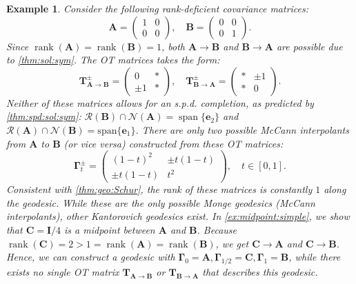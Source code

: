 \documentclass[noinfoline]{imsart}\setcounter{tocdepth}{2}
\newcommand{\m}[1]{\mathbf{#1}} %
\renewcommand{\c}[1]{\mathcal{#1}} %
\DeclareMathOperator*{\spann}{span}
\DeclareMathOperator*{\rk}{rank}
\theoremstyle{plain}
\newtheorem{example}{Example}[section]
\begin{document}
\begin{example}\label{ex:rk:goes:up}
Consider the following rank-deficient covariance matrices:
\begin{equation*}
    \m{A} = \begin{pmatrix}
    1 & 0 \\
    0 & 0
    \end{pmatrix}, \quad \m{B} = \begin{pmatrix}
    0 & 0 \\
    0 & 1
    \end{pmatrix}.
\end{equation*}
Since $\rk (\m{A}) = \rk (\m{B}) = 1$, both $\m{A} \to \m{B}$ and $\m{B} \to \m{A}$ are possible due to \cref{thm:sol:sym}. The OT matrices takes the form:
\begin{equation*}
    \m{T}_{\m{A} \to \m{B}}^{\pm} = \begin{pmatrix}
    0 & * \\
    \pm 1 & *
    \end{pmatrix}, \quad \m{T}_{\m{B} \to \m{A}}^{\pm} = \begin{pmatrix}
    * & \pm 1 \\
    * & 0
    \end{pmatrix}.
\end{equation*}
Neither of these matrices allows for an s.p.d. completion, as predicted by \cref{thm:spd:sol:sym}: $\c{R}(\m{B}) \cap \c{N}(\m{A}) = \spann \{\m{e}_{2}\}$ and $\c{R}(\m{A}) \cap \c{N}(\m{B}) = \mathrm{span}\{\m{e}_{1}\}$.
There are only two possible McCann interpolants from $\m{A}$ to $\m{B}$ (or \textit{vice versa}) constructed from these OT matrices:
\begin{equation*}
    \m{\Gamma}_{t}^{\pm} = \begin{pmatrix}
    (1-t)^{2} & \pm t (1-t)  \\
    \pm t (1-t) & t^{2}
    \end{pmatrix}, \quad t \in [0, 1].
\end{equation*}
Consistent with \cref{thm:geo:Schur}, the rank of these matrices is constantly $1$ along the geodesic. While these are the only possible \textit{Monge} geodesics (McCann interpolants), other \textit{Kantorovich} geodesics exist. In \cref{ex:midpoint:simple}, we show that $\m{C} = \m{I}/4$ is a midpoint between $\m{A}$ and $\m{B}$. 
Because $\rk (\m{C}) = 2 > 1 = \rk (\m{A}) = \rk (\m{B})$, we get $\m{C} \to \m{A}$ and $\m{C} \to \m{B}$. Hence, we can construct a geodesic with $\m{\Gamma}_{0} = \m{A}, \m{\Gamma}_{1/2} = \m{C}, \m{\Gamma}_{1} = \m{B}$, while there exists no single OT matrix $\m{T}_{\m{A} \to \m{B}}$ or $\m{T}_{\m{B} \to \m{A}}$ that describes this geodesic.
\end{example}
\end{document}

